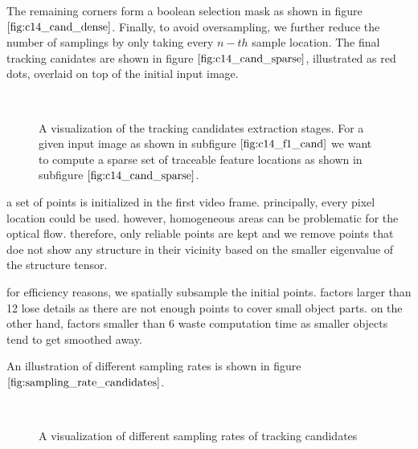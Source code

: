  The remaining corners form a boolean selection mask as shown in figure $\ref{fig:c14_cand_dense}$. Finally, to avoid oversampling, we further reduce the number of samplings by only taking every $n-th$ sample location. The final tracking canidates are shown in figure $\ref{fig:c14_cand_sparse}$, illustrated as red dots, overlaid on top of the initial input image.
\begin{figure}[H]
\begin{center}
~
\end{center}
\caption[Tracking Candidates]{A visualization of the tracking candidates extraction stages. For a given input image as shown in subfigure $\ref{fig:c14_f1_cand}$ we want to compute a sparse set of traceable feature locations as shown in subfigure $\ref{fig:c14_cand_sparse}$.}
\label{fig:tracable_candidates}
\end{figure}


a set of points is initialized in the first video frame.
principally, every pixel location could be used. however, homogeneous areas can be problematic for the optical flow. therefore, only reliable points are kept and we remove points that doe not show any structure in their vicinity based on the smaller eigenvalue of the structure tensor. 

for efficiency reasons, we spatially subsample the initial points.
factors larger than 12 lose details as there are not enough points to cover small object parts. on the other hand, factors smaller than 6 waste computation time as smaller objects tend to get smoothed away. 

An illustration of different sampling rates is shown in figure $\ref{fig:sampling_rate_candidates}$.
\begin{figure}[H]
\begin{center}
~
\end{center}
\caption[Density Of Candidates For Different Sampling Rates]{A visualization of different sampling rates of tracking candidates}
\label{fig:sampling_rate_candidates}
\end{figure}


